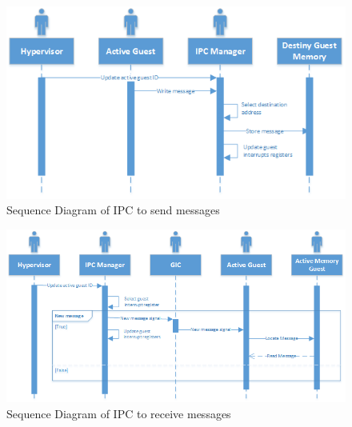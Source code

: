 

\begin{figure} [!h]
	\centering
	\includegraphics[width=\textwidth]{Figures/Seq_diagram_send} 
	\caption[Sequence diagram of IPC to send messages]{Sequence Diagram of IPC to send messages}
	\label{img_seq_diagram_send}
\end{figure}


\begin{figure} [!h]
	\centering
	\includegraphics[width=\textwidth]{Figures/Seq_diagram_receive} 
	\caption[Sequence diagram of IPC to receive messages]{Sequence Diagram of IPC to receive messages}
	\label{img_seq_diagram_receive}
\end{figure}